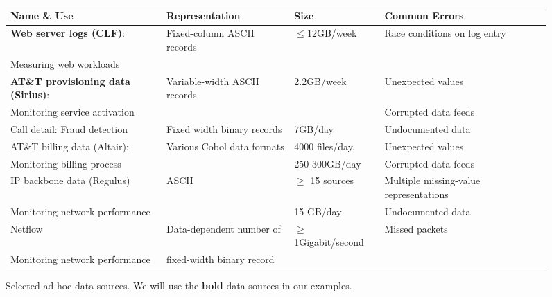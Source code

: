 \documentclass{sig-alternate}
\newcommand{\dibbler}{Sirius}
\newcommand{\ningaui}{Altair}
\newcommand{\darkstar}{Regulus}
\begin{document}
\begin{figure*}
\begin{center}
\begin{tabular}{|l|l|l|l|l|}
\hline
Name \& Use   &  Representation              &Size           & Common Errors \\ \hline\hline
\textbf{Web server logs (CLF)}: &  Fixed-column ASCII records & $\leq$12GB/week & Race conditions on log entry\\ 
Measuring web workloads                   &                             &                             & \\ \hline
\textbf{AT\&T provisioning data (\dibbler{})}: & Variable-width ASCII records & 2.2GB/week & Unexpected values \\ 
Monitoring service activation &                              &            & Corrupted data feeds \\ \hline
Call detail: Fraud detection  &  Fixed width binary records  &\appr{}7GB/day &  Undocumented data\\  \hline 
AT\&T billing data (\ningaui{}): & Various Cobol data formats  & \appr{}4000 files/day, & Unexpected values\\ 
Monitoring billing process   &                             & 250-300GB/day    & Corrupted data feeds \\ \hline
IP backbone data (\darkstar{})  & ASCII  & $\ge$ 15 sources  & Multiple missing-value representations \\
Monitoring network performance  &        & \appr{}15 GB/day              & Undocumented data \\ \hline
Netflow       & Data-dependent number of     & $\ge$1Gigabit/second  & Missed packets\\ 
Monitoring network performance              &  fixed-width binary record   &                       & \\ \hline

\end{tabular}
\caption{Selected ad hoc data sources.  We will use the \textbf{bold} data sources in our examples. }
\label{figure:data-sources}
\end{center}
\end{figure*}
\end{document}
